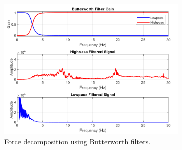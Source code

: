 \documentclass{article}
\begin{document}
\begin{figure}[htbp]
    \centering
    \includegraphics[width=0.8\textwidth]{high_low_pass.png}
    \caption{Force decomposition using Butterworth filters.}
    \label{fig:high_low_pass}
\end{figure}
\end{document}
